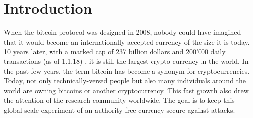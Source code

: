 

\chapter{\label{introduction}Introduction}
When the bitcoin protocol was designed in 2008, nobody could have imagined that it would become an internationally accepted currency of the size it is today. 10 years later, with a marked cap of 237 billion dollars and 200'000 daily transactions (as of 1.1.18) \cite{bitcoinexplorer}, it is still the largest crypto currency in the world. In the past few years, the term bitcoin has become a synonym for cryptocurrencies. Today, not only technically-versed people but also many individuals around the world are owning bitcoins or another cryptocurrency.
This fast growth also drew the attention of the research community worldwide. The goal is to keep this global scale experiment of an authority free currency secure against attacks.



